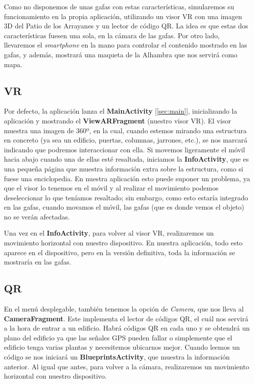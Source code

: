 \documentclass[11pt,a4paper]{article}
\begin{document}
Como no disponemos de unas gafas con estas características, simularemos su funcionamiento en la propia aplicación, utilizando un visor
VR con una imagen 3D del Patio de los Arrayanes y un lector de código QR. La idea es que estas dos características fuesen una sola, en
la cámara de las gafas. Por otro lado, llevaremos el \textit{smartphone} en la mano para controlar el contenido mostrado en las gafas, y
además, mostrará una maqueta de la Alhambra que nos servirá como mapa.

\subsection{VR}
\label{sec:vr}

Por defecto, la aplicación lanza el \textbf{MainActivity} [\ref{sec:main}], inicializando la aplicación y mostrando el \textbf{ViewARFragment}
(nuestro visor VR). El visor muestra una imagen de 360º, en la cual, cuando estemos mirando una estructura en concreto
(ya sea un edificio, puertas, columnas, jarrones, etc.), se nos marcará indicando que podremos interaccionar con ella.
Si movemos ligeramente el móvil hacia abajo cuando una de ellas esté resaltada, iniciamos la \textbf{InfoActivity},
que es una pequeña página que muestra información extra sobre la estructura, como si fuese una enciclopedia. En nuestra
aplicación esto puede suponer un problema, ya que el visor lo tenemos en el móvil y al realizar el movimiento
podemos deseleccionar lo que teníamos resaltado; sin embargo, como esto estaría integrado en las gafas, cuando movamos el móvil, las gafas
(que es donde vemos el objeto) no se verán afectadas.

Una vez en el \textbf{InfoActivity}, para volver al visor VR, realizaremos un movimiento horizontal con nuestro dispositivo.
En nuestra aplicación, todo esto aparece en el dispositivo, pero en la versión definitiva, toda la información se mostraría en
las gafas.

\subsection{QR}

En el menú desplegable, también tenemos la opción de \textit{Camera}, que nos lleva al \textbf{CameraFragment}. Este implementa el
lector de códigos QR, el cuál nos servirá a la hora de entrar a un edificio. Habrá códigos QR en cada uno y se obtendrá un plano
del edificio ya que las señales GPS pueden fallar o simplemente que el edificio tenga varias plantas y necesitemos ubicarnos mejor.
Cuando leemos un código se nos iniciará un \textbf{BlueprintsActivity}, que muestra la información anterior. Al igual que antes,
para volver a la cámara, realizaremos un movimiento horizontal con nuestro dispositivo.
\end{document}

